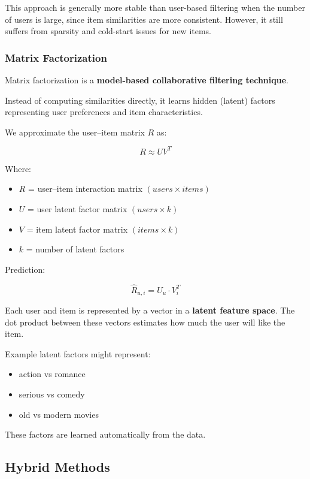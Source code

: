 \documentclass[10pt,a4paper]{article}
\begin{document}
	\vspace{0.3em}

	This approach is generally more stable than user-based filtering when the number of users is large, since item similarities are more consistent. However, it still suffers from sparsity and cold-start issues for new items.

	\subsubsection{Matrix Factorization}

	Matrix factorization is a \textbf{model-based collaborative filtering technique}.

	Instead of computing similarities directly, it learns hidden (latent) factors representing user preferences and item characteristics.

	We approximate the user–item matrix $R$ as:

	\[
	R \approx U V^T
	\]

	Where:

	\begin{itemize}
		\item $R$ = user–item interaction matrix $(users \times items)$
		\item $U$ = user latent factor matrix $(users \times k)$
		\item $V$ = item latent factor matrix $(items \times k)$
		\item $k$ = number of latent factors
	\end{itemize}

	Prediction:

	\[
	\hat{R}_{u,i} = U_u \cdot V_i^T
	\]

	Each user and item is represented by a vector in a \textbf{latent feature space}.
	The dot product between these vectors estimates how much the user will like the item.

	Example latent factors might represent:

	\begin{itemize}
		\item action vs romance
		\item serious vs comedy
		\item old vs modern movies
	\end{itemize}

	These factors are learned automatically from the data.

	
	\subsection{Hybrid Methods}
	
\end{document}
